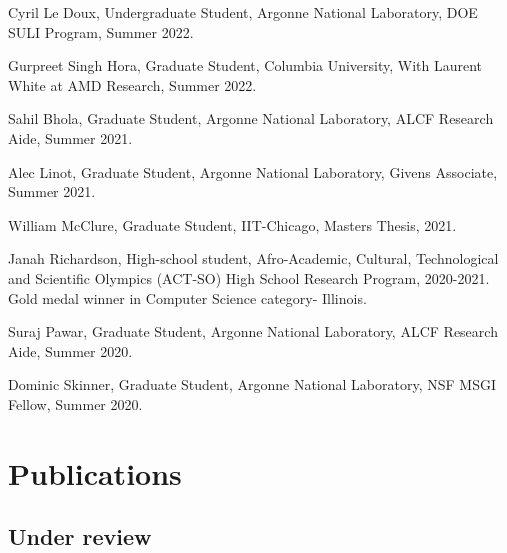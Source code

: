 \documentclass[letterpaper]{article}
\renewenvironment{itemize}{
  \begin{list}{}{
    \setlength{\leftmargin}{1.5em}
  }
}{
  \end{list}
}
\begin{document}
\begin{itemize}
  \item Cyril Le Doux, Undergraduate Student, Argonne National Laboratory, DOE SULI Program, Summer 2022.

  \item Gurpreet Singh Hora, Graduate Student, Columbia University, With Laurent White at AMD Research, Summer 2022.

  \item Sahil Bhola, Graduate Student, Argonne National Laboratory, ALCF Research Aide, Summer 2021.

  \item Alec Linot, Graduate Student, Argonne National Laboratory, Givens Associate, Summer 2021.

  \item William McClure, Graduate Student, IIT-Chicago, Masters Thesis, 2021. 

  \item Janah Richardson, High-school student, Afro-Academic, Cultural, Technological and Scientific Olympics (ACT-SO) High School Research Program, 2020-2021. Gold medal winner in Computer Science category- Illinois.

  \item Suraj Pawar, Graduate Student, Argonne National Laboratory, ALCF Research Aide, Summer 2020.

  \item Dominic Skinner, Graduate Student, Argonne National Laboratory, NSF MSGI Fellow, Summer 2020.

\end{itemize}


\section*{Publications}

\subsection*{Under review}
\end{document}
